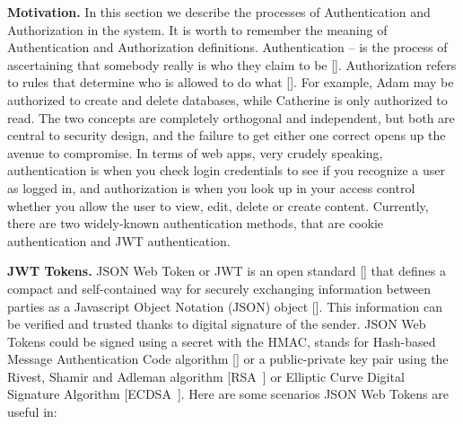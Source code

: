 \textbf{Motivation.} In this section we describe the processes of Authentication and Authorization in the system.
It is worth to remember the meaning of Authentication and Authorization definitions.
Authentication -- is the process of ascertaining that somebody really is who they claim to be [\cite{burrows1989logic}].
Authorization refers to rules that determine who is allowed to do what [\cite{fagin1978authorization}].
For example, Adam may be authorized to create and delete databases, while Catherine is only authorized to read.
The two concepts are completely orthogonal and independent, but both are central to security design, and the
failure to get either one correct opens up the avenue to compromise.
In terms of web apps, very crudely speaking, authentication is when you check login credentials to see if you recognize
a user as logged in, and authorization is when you look up in your access control whether you allow the user to view,
edit, delete or create content.
Currently, there are two widely-known authentication methods, that are cookie authentication and JWT authentication.

\textbf{JWT Tokens.}
JSON Web Token or JWT is an open standard [\cite{jones2015rfc}] that defines a compact and self-contained way for securely
exchanging information between parties as a Javascript Object Notation (JSON) object [\cite{jones2015json}].
This information can be verified and trusted thanks to digital signature of the sender.
JSON Web Tokens could be signed using a secret with the HMAC,
stands for Hash-based Message Authentication Code algorithm [\cite{wang2004hmac}] or a public-private key pair using
the Rivest, Shamir and Adleman algorithm [RSA~\cite{wiener1990cryptanalysis}] or Elliptic Curve Digital Signature Algorithm
[ECDSA~\cite{johnson2001elliptic}].
Here are some scenarios JSON Web Tokens are useful in:

